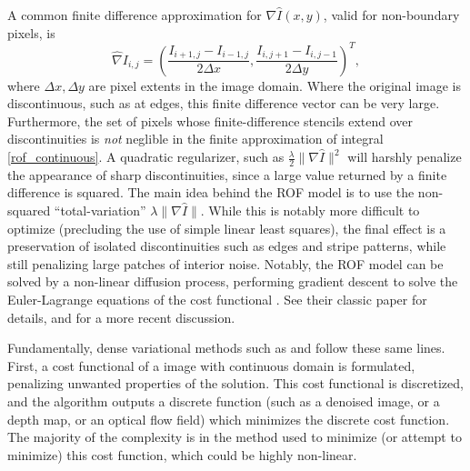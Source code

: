 \documentclass[conference]{IEEEtran}
\begin{document}
A common finite difference approximation for $\nabla\hat{I}(x,y)$, valid for non-boundary pixels, is
\begin{equation}
    \hat{\nabla}I_{i,j} = \left(\frac{I_{i+1,j} - I_{i-1,j}}{2\Delta x}, \frac{I_{i,j+1} - I_{i,j-1}}{2\Delta y}\right)^T,
\end{equation}
where $\Delta x, \Delta y$ are pixel extents in the image domain. Where the original image is discontinuous, such as at edges,
this finite difference vector can be very large. Furthermore, the set of pixels whose finite-difference stencils extend over discontinuities is
\textit{not} neglible in the finite approximation of integral \eqref{rof_continuous}. A quadratic regularizer, such as
$\frac{\lambda}{2} \|\nabla \hat{I}\|^2$ will harshly penalize the appearance of sharp discontinuities, since a large value returned
by a finite difference is squared. The main idea behind the ROF model is to use the non-squared ``total-variation'' $\lambda \|\nabla \hat{I}\|$.
While this is notably more difficult to optimize (precluding the use of simple linear least squares), the final effect is a preservation
of isolated discontinuities such as edges and stripe patterns, while still penalizing large patches of interior noise. Notably, the ROF model can be solved by a non-linear diffusion process, performing gradient descent to solve the Euler-Lagrange
equations of the cost functional \cite{variational_calculus}. See their classic paper \cite{rof} for details, and \cite{variational_lectures} for a more recent discussion.

Fundamentally, dense variational methods such as \cite{horn_schunck} and \cite{dense_geometry} follow these same lines. First,
a cost functional of a image with continuous domain is formulated, penalizing unwanted properties of the solution. This cost functional is discretized,
and the algorithm outputs a discrete function (such as a denoised image, or a depth map, or an optical flow field) which minimizes the discrete cost function.
The majority of the complexity is in the method used to minimize (or attempt to minimize) this cost function, which could be highly non-linear.


\end{document}
